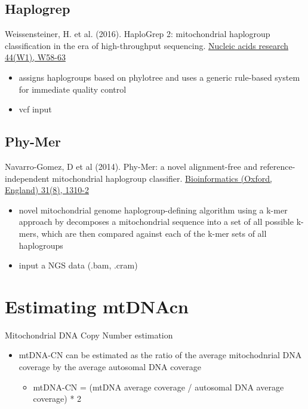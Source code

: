 \documentclass[]{book}
\providecommand{\tightlist}{%
  \setlength{\itemsep}{0pt}\setlength{\parskip}{0pt}}
\begin{document}
\hypertarget{haplogrep}{%
\subsection{Haplogrep}\label{haplogrep}}

Weissensteiner, H. et al. (2016). HaploGrep 2: mitochondrial haplogroup classification in the era of high-throughput sequencing. \href{https://dx.doi.org/10.1093/nar/gkw233}{Nucleic acids research 44(W1), W58-63}

\begin{itemize}
\tightlist
\item
  assigns haplogroups based on phylotree and uses a generic rule-based system for immediate quality control
\item
  vcf input
\end{itemize}

\hypertarget{phy-mer}{%
\subsection{Phy-Mer}\label{phy-mer}}

Navarro-Gomez, D et al (2014). Phy-Mer: a novel alignment-free and reference-independent mitochondrial haplogroup classifier. \href{https://dx.doi.org/10.1093/bioinformatics/btu825}{Bioinformatics (Oxford, England) 31(8), 1310-2}

\begin{itemize}
\tightlist
\item
  novel mitochondrial genome haplogroup-defining algorithm using a k-mer approach by decomposes a mitochondrial sequence into a set of all possible k-mers, which are then compared against each of the k-mer sets of all haplogroups
\item
  input a NGS data (.bam, .cram)
\end{itemize}

\hypertarget{estimating-mtdnacn}{%
\section{Estimating mtDNAcn}\label{estimating-mtdnacn}}

Mitochondrial DNA Copy Number estimation

\begin{itemize}
\tightlist
\item
  mtDNA-CN can be estimated as the ratio of the average mitochodnrial DNA coverage by the average autosomal DNA coverage

  \begin{itemize}
  \tightlist
  \item
    mtDNA-CN = (mtDNA average coverage / autosomal DNA average coverage) * 2
  \end{itemize}
\end{itemize}
\end{document}
